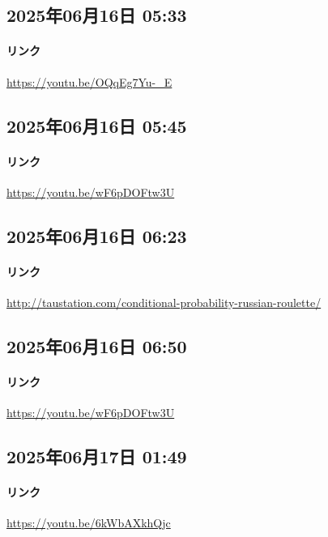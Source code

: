 \subsection*{2025年06月16日 05:33}

\paragraph{リンク}
\url{https://youtu.be/OQqEg7Yu-_E}

\subsection*{2025年06月16日 05:45}

\paragraph{リンク}
\url{https://youtu.be/wF6pDOFtw3U}

\subsection*{2025年06月16日 06:23}

\paragraph{リンク}
\url{http://taustation.com/conditional-probability-russian-roulette/}

\subsection*{2025年06月16日 06:50}

\paragraph{リンク}
\url{https://youtu.be/wF6pDOFtw3U}

\subsection*{2025年06月17日 01:49}

\paragraph{リンク}
\url{https://youtu.be/6kWbAXkhQjc}

